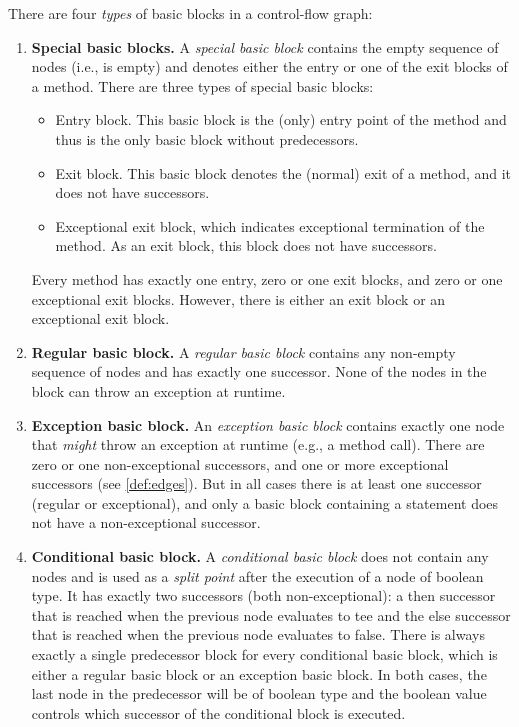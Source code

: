 \begin{definition}
    There are four \emph{types} of basic blocks in a control-flow graph:
    \begin{enumerate}
        \item \textbf{Special basic blocks.} A \emph{special basic block} contains
        the empty sequence of nodes (i.e., is empty) and denotes either the
        entry or one of the exit blocks of a method. There are three types
        of special basic blocks:
        \begin{itemize}
            \item Entry block. This basic block is the (only) entry point of the
            method and thus is the only basic block without predecessors.
            \item Exit block. This basic block denotes the (normal) exit of
            a method, and it does not have successors.
            \item Exceptional exit block, which indicates exceptional termination
            of the method. As an exit block, this block does not have successors.
        \end{itemize}
        Every method has exactly one entry, zero or one exit blocks, and zero or one
        exceptional exit blocks. However, there is either an exit block or an exceptional
        exit block.
        \item \textbf{Regular basic block.} A \emph{regular basic block} contains
        any non-empty sequence of nodes and has exactly one successor.
        None of the nodes in the block can throw an exception at runtime.
        \item \textbf{Exception basic block.} An \emph{exception basic block} contains exactly
        one node that \emph{might} throw an exception at runtime (e.g., a method call).
        There are zero or one non-exceptional successors, and one
        or more exceptional successors (see \autoref{def:edges}). But in all cases there
        is at least one successor (regular or exceptional), and only a basic block
        containing a  statement does not have a non-exceptional successor.
        \item \textbf{Conditional basic block.} A \emph{conditional basic block}
        does not contain any nodes and is used as a \emph{split point} after the execution
        of a node of boolean type. It has exactly two successors (both non-exceptional): a then
        successor that is reached when the previous node evaluates to tee and the else successor
        that is reached when the previous node evaluates to false.
        There is always exactly a single predecessor block for every conditional basic block, which
        is either a regular basic block or an exception basic block. In both cases, the last node
        in the predecessor will be of boolean type
        and the boolean value controls which successor of the conditional block is executed.
    \end{enumerate}
\end{definition}

